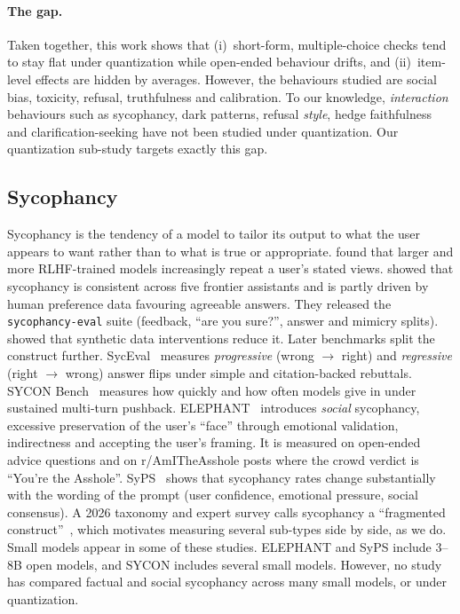 \paragraph{The gap.} Taken together, this work shows that (i)~short-form,
multiple-choice checks tend to stay flat under quantization while open-ended
behaviour drifts, and (ii)~item-level effects are hidden by averages. However, the
behaviours studied are social bias, toxicity, refusal, truthfulness and calibration.
To our knowledge, \emph{interaction} behaviours such as sycophancy, dark patterns,
refusal \emph{style}, hedge faithfulness and clarification-seeking have not been
studied under quantization. Our quantization sub-study targets exactly this gap.

\subsection{Sycophancy}
Sycophancy is the tendency of a model to tailor its output to what the user appears
to want rather than to what is true or appropriate. \citet{perez2023discovering}
found that larger and more RLHF-trained models increasingly repeat a user's stated
views. \citet{sharma2024sycophancy} showed that sycophancy is consistent across five
frontier assistants and is partly driven by human preference data favouring
agreeable answers. They released the \texttt{sycophancy-eval} suite (feedback,
``are you sure?'', answer and mimicry splits). \citet{wei2023simple} showed that
synthetic data interventions reduce it. Later benchmarks split the construct
further. SycEval~\citep{fanous2025syceval} measures \emph{progressive} (wrong
$\rightarrow$ right) and \emph{regressive} (right $\rightarrow$ wrong) answer flips
under simple and citation-backed rebuttals. SYCON Bench~\citep{hong2025sycon}
measures how quickly and how often models give in under sustained multi-turn
pushback. ELEPHANT~\citep{cheng2025elephant} introduces \emph{social} sycophancy,
\ie excessive preservation of the user's ``face'' through emotional validation,
indirectness and accepting the user's framing. It is measured on open-ended advice
questions and on r/AmITheAsshole posts where the crowd verdict is ``You're the
Asshole''. SyPS~\citep{syps2026} shows that sycophancy rates change substantially
with the wording of the prompt (user confidence, emotional pressure, social
consensus). A 2026 taxonomy and expert survey calls sycophancy a ``fragmented
construct''~\citep{ye2026sycophancy}, which motivates measuring several sub-types
side by side, as we do. Small models appear in some of these studies. ELEPHANT and
SyPS include 3--8B open models, and SYCON includes several small models. However, no
study has compared factual and social sycophancy across many small models, or under
quantization.

